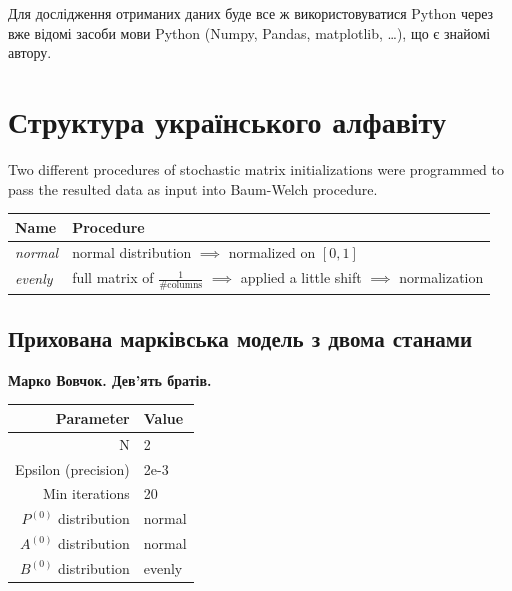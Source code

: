 \documentclass[12pt,a4paper]{article}
\begin{document}
  Для дослідження отриманих даних буде все ж використовуватися Python
  через вже відомі засоби мови
  Python (Numpy, Pandas, matplotlib, \ldots), що є знайомі автору.



  \section{Структура українського алфавіту}

  Two different procedures of stochastic matrix initializations
  were programmed to pass the resulted data as input into
  Baum-Welch procedure.

  \begin{tabular}{ | p{2cm} | p{9cm} | }
    \hline
    Name & Procedure \\
    \hline
    \textit{normal} & normal distribution $\implies$ normalized on $[0, 1]$ \\
    \hline
    \textit{evenly} & full matrix of $\frac{1}{\text{\#columns}}$ $\implies$ applied a little shift $\implies$ normalization \\
    \hline
  \end{tabular}


  \subsection{Прихована марківська модель з двома станами}

  \textbf{Марко Вовчок. Дев'ять братів.}

  \begin{center}
  \begin{tabular}{ | r | l | }
    \hline
    Parameter & Value \\
    \hline
    N & 2 \\
    \hline
    Epsilon (precision) & 2e-3 \\
    \hline
    Min iterations & 20 \\
    \hline
    $P^{(0)}$ distribution & normal \\
    \hline
    $A^{(0)}$ distribution & normal \\
    \hline
    $B^{(0)}$ distribution & evenly  \\
    \hline
  \end{tabular}
  \end{center}
\end{document}
